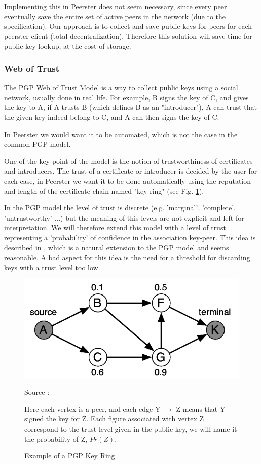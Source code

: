 \documentclass[]{article}
\begin{document}
Implementing this in Peerster does not seem necessary, since every peer eventually save the entire set of active peers in the network (due to the specification). Our approach is to collect and save public keys for peers for each peerster client (total decentralization). Therefore this solution will save time for public key lookup, at the cost of storage.

\subsubsection{Web of Trust}
\label{sec:related-work-wot}

The PGP Web of Trust Model \cite{abdul1997pgp} is a way to collect public keys using a social network, usually done in real life. For example, B signs the key of C, and gives the key to A, if A trusts B (which defines B as an "introducer"), A can trust that the given key indeed belong to C, and A can then signs the key of C. 

In Peerster we would want it to be automated, which is not the case in the common PGP model. 

One of the key point of the model is the notion of trustworthiness of certificates and introducers. The trust of a certificate or introducer is decided by the user for each case, in Peerster we want it to be done automatically using the reputation and length of the certificate chain named "key ring" (see Fig. \ref{fig:pgp-key-ring}).

In the PGP model the level of trust is discrete (e.g. 'marginal', 'complete', 'untrustworthy' ...) but the meaning of this levels are not explicit and left for interpretation. We will therefore extend this model with a level of trust representing a 'probability' of confidence in the association key-peer. This idea is described in \cite{haenni2007new}, which is a natural extension to the PGP model and seems reasonable.
A bad aspect for this idea is the need for a threshold for discarding keys with a trust level too low.

\begin{figure}[h]
\includegraphics{pgp-key-ring}
\centering
\caption{Example of a PGP Key Ring}
\label{fig:pgp-key-ring}
Source : \cite{haenni2007new}

Here each vertex is a peer, and each edge Y $\rightarrow$ Z means that Y signed the key for Z.
Each figure associated with vertex Z  correspond to the trust level given in the public key, we will name it the probability of Z, $Pr(Z)$.
\end{figure}
\end{document}
